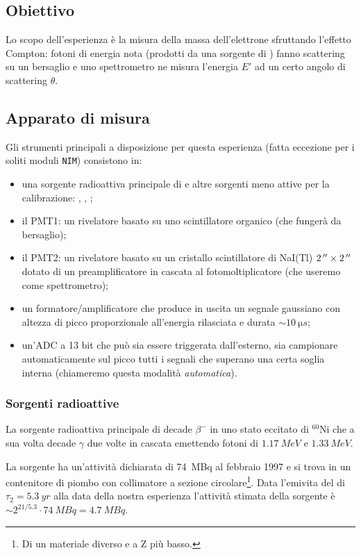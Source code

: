 \subsection{Obiettivo}
Lo scopo dell'esperienza è la misura della massa dell'elettrone sfruttando l'effetto Compton: fotoni di energia nota (prodotti da una sorgente di \co) fanno scattering su un bersaglio e uno spettrometro ne misura l'energia $E'$ ad un certo angolo di scattering $\theta$.

\subsection{Apparato di misura}
Gli strumenti principali a disposizione per questa esperienza (fatta eccezione per i soliti moduli \texttt{NIM}) consistono in:
\begin{itemize}
	\item una sorgente radioattiva principale di \co\! e altre sorgenti meno attive per la calibrazione: \cs, \na, \am;
	\item il PMT1: un rivelatore basato su uno scintillatore organico (che fungerà da bersaglio);
	\item il PMT2: un rivelatore basato su un cristallo scintillatore di NaI(Tl) $\SI2{''}\times\SI2{''}$ dotato di un preamplificatore in cascata al fotomoltiplicatore (che useremo come spettrometro);
	\item un formatore/amplificatore che produce in uscita un segnale gaussiano con altezza di picco proporzionale all'energia rilasciata e durata $\sim \SI{10}{\micro s}$;
	\item un'ADC a 13 bit che può sia essere triggerata dall'esterno, sia campionare automaticamente sul picco tutti i segnali che superano una certa soglia interna (chiameremo questa modalità \emph{automatica}).
\end{itemize}

\subsubsection{Sorgenti radioattive}
La sorgente radioattiva principale di \co\; decade $\beta^-$ in uno stato eccitato di $^{60}$Ni che a sua volta decade $\gamma$ due volte in cascata emettendo fotoni di $\SI{1.17}{MeV}$ e $\SI{1.33}{MeV}$.

La sorgente ha un'attività dichiarata di \SI{74}{MBq} al febbraio 1997 e si trova in un contenitore di piombo con collimatore a sezione circolare\footnote{Di un materiale diverso e a Z più basso.}. 
Data l'emivita del \co\; di $\tau_2 = \SI{5.3}{yr}$ alla data della nostra esperienza l'attività stimata della sorgente è $\sim 2^{21/5.3} \cdot \SI{74}{MBq} = \SI{4.7}{MBq}$.

